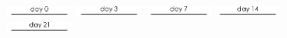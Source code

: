\documentclass[onecolumn,10pt]{asme2ej}
\begin{document}
\begin{figure}[h]
	\includegraphics[width=0.196\textwidth]{figures/IF/charac(light)/d0}
	\includegraphics[width=0.196\textwidth]{figures/IF/charac(light)/d3}
	\includegraphics[width=0.196\textwidth]{figures/IF/charac(light)/d7}
	\includegraphics[width=0.196\textwidth]{figures/IF/charac(light)/d14}
	\includegraphics[width=0.196\textwidth]{figures/IF/charac(light)/d21}
	

\end{figure}
\end{document}
